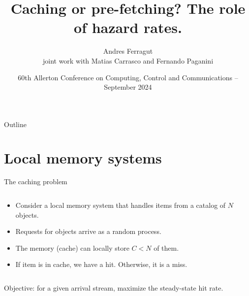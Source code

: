\documentclass[aspectratio=169]{beamer}
\title{Caching or pre-fetching? The role of hazard rates.}
\author[Andres Ferragut, Universidad ORT Uruguay]{Andres Ferragut\\[.6em] \normalsize joint work with Matias Carrasco and Fernando Paganini}
\institute{Universidad ORT Uruguay}
\date[Allerton 2024 -- UIUC]{60th Allerton Conference on Computing, Control and Communications -- September 2024}
\newenvironment*{myitem}[1][1.5em]{\begin{itemize}\setlength{\itemsep}{#1}}{\end{itemize}}
\begin{document}
\frame[plain]{\titlepage}

\begin{frame}{Outline}
\tableofcontents
\end{frame}

\section{Local memory systems}

\begin{frame}{The caching problem}
	
	\begin{columns}
		\begin{column}{0.61\textwidth}
			\begin{myitem}[2em]
				\item Consider a \alert{local memory system} that handles items from a catalog of $N$ objects.
				\item Requests for objects arrive as a random process.
				\item The memory (cache) can locally store $C<N$ of them.
				\item If item is in cache, we have a \alert{hit}. Otherwise, it is a \alert{miss}.
			\end{myitem}
		\end{column}
		\begin{column}{0.39\textwidth}
			\centering
			
		\end{column}
	\end{columns}

	\vfill

	\centering
	\alert{Objective:} for a given arrival stream, maximize the steady-state \alert{hit rate}.
\end{frame}
\end{document}
